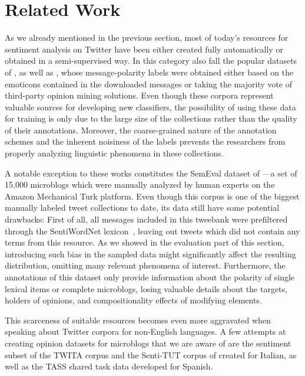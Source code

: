 \section{Related Work}

As we already mentioned in the previous section, most of today's
resources for sentiment analysis on Twitter have been either created
fully automatically or obtained in a semi-supervised way.  In this
category also fall the popular datasets of \citet{Go:09},
\citet{Barbosa:10} as well as \citet{Pak:10}, whose message-polarity
labels were obtained either based on the emoticons contained in the
downloaded messages or taking the majority vote of third-party opinion
mining solutions.  Even though these corpora represent valuable
sources for developing new classifiers, the possibility of using these
data for training is only due to the large size of the collections
rather than the quality of their annotations.  Moreover, the
coarse-grained nature of the annotation schemes and the inherent
noisiness of the labels prevents the researchers from properly
analyzing linguistic phenomena in these collections.

A notable exception to these works constitutes the SemEval dataset of
\citet{Nakov:13}---a set of 15,000 microblogs which were manually
analyzed by human experts on the Amazon Mechanical Turk platform.
Even though this corpus is one of the biggest manually labeled tweet
collections to date, its data still have some potential drawbacks:
First of all, all messages included in this tweebank were prefiltered
through the SentiWordNet lexicon~\cite{Esuli:06b}, leaving out tweets
which did not contain any terms from this resource.  As we showed in
the evaluation part of this section, introducing such bias in the
sampled data might significantly affect the resulting distribution,
omitting many relevant phenomena of interest.  Furthermore, the
annotations of this dataset only provide information about the
polarity of single lexical items or complete microblogs, losing
valuable details about the targets, holders of opinions, and
compositionality effects of modifying elements.

This scarceness of suitable resources becomes even more aggravated
when speaking about Twitter corpora for non-English languages.  A few
attempts at creating opinion datasets for microblogs that we are aware
of are the sentiment subset of the TWITA corpus \cite{Basile:13} and
the Senti-TUT corpus of \citet{Bosco:13} created for Italian, as well
as the TASS shared task data \cite{Villena-Roman:13} developed for
Spanish.

